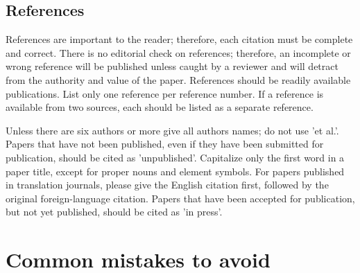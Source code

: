 \documentclass{IEEEtran4PSCC}
\begin{document}
\subsection{References}
References are important to the reader; therefore, each citation must be complete and correct. There is no editorial check on references; therefore, an incomplete or wrong reference will be published unless caught by a reviewer and will detract from the authority and value of the paper. References should be readily available publications. 
List only one reference per reference number. If a reference is available from two sources, each should be listed as a separate reference.

Unless there are six authors or more give all authors names; do not use 'et al.'. Papers that have not been published, even if they have been submitted for publication, should be cited as 'unpublished'. Capitalize only the first word in a paper title, except for proper nouns and element symbols. For papers published in translation journals, please give the English citation first, followed by the original foreign-language citation. Papers that have been accepted for publication, but not yet published, should be cited as 'in press'.


\section{Common mistakes to avoid}
\end{document}
